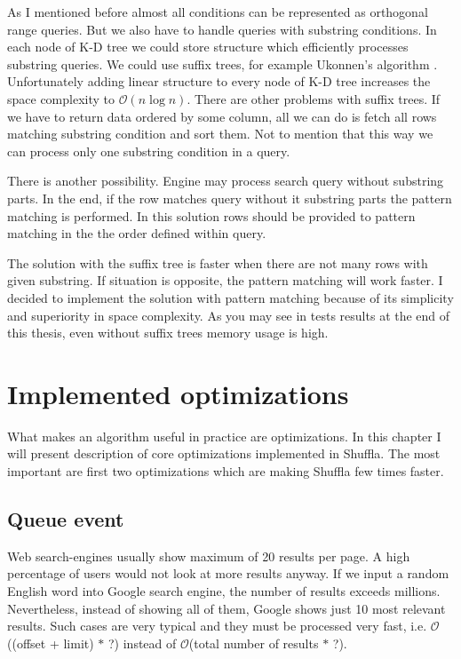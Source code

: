 \documentclass[10pt,a4paper]{article}
\newcommand{\Oh}{\mathcal{O}}
\begin{document}
\bigskip

As I mentioned before almost all conditions can be represented as orthogonal range queries. But we also have to handle queries with substring conditions. In each node of K-D tree we could store structure which efficiently processes substring queries. We could use suffix trees, for example Ukonnen's algorithm \cite{STUKK}. Unfortunately adding linear structure to every node of K-D tree increases the space complexity to $\Oh(n \log n)$. There are other problems with suffix trees. If we have to return data ordered by some column, all we can do is fetch all rows matching substring condition and sort them. Not to mention that this way we can process only one substring condition in a query.

There is another possibility. Engine may process search query without substring parts. In the end, if the row matches query without it substring parts the pattern matching is performed. In this solution rows should be provided to pattern matching in the the order defined within query.

The solution with the suffix tree is faster when there are not many rows with given substring. If situation is opposite, the pattern matching will work faster. I decided to implement the solution with pattern matching because of its simplicity and superiority in space complexity. As you may see in tests results at the end of this thesis, even without suffix trees memory usage is high. 

\section{Implemented optimizations}

What makes an algorithm useful in practice are optimizations. In this chapter I will present description of core optimizations implemented in Shuffla. The most important are first two optimizations which are making Shuffla few times faster.

\subsection{Queue event}
Web search-engines usually show maximum of 20 results per page. A high percentage of users would not look at more results anyway. If we input a random English word into Google search engine, the number of results exceeds millions. Nevertheless, instead of showing all of them, Google shows just 10 most relevant results. Such cases are very typical and they must be processed very fast, i.e. $\Oh$((offset + limit) $*$ ?) instead of $\Oh$(total number of results $*$ ?).
\end{document}
